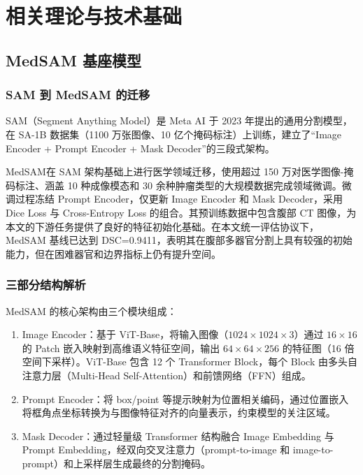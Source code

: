 \chapter{相关理论与技术基础}

\section{MedSAM 基座模型}

\subsection{SAM 到 MedSAM 的迁移}

SAM（Segment Anything Model）\cite{kirillov2023segment}是 Meta AI 于 2023 年提出的通用分割模型，在 SA-1B 数据集（1100 万张图像、10 亿个掩码标注）上训练，建立了“Image Encoder + Prompt Encoder + Mask Decoder”的三段式架构。

MedSAM\cite{ma2024medsam}在 SAM 架构基础上进行医学领域迁移，使用超过 150 万对医学图像-掩码标注、涵盖 10 种成像模态和 30 余种肿瘤类型的大规模数据完成领域微调。微调过程冻结 Prompt Encoder，仅更新 Image Encoder 和 Mask Decoder，采用 Dice Loss 与 Cross-Entropy Loss 的组合。其预训练数据中包含腹部 CT 图像，为本文的下游任务提供了良好的特征初始化基础。在本文统一评估协议下，MedSAM 基线已达到 DSC=0.9411，表明其在腹部多器官分割上具有较强的初始能力，但在困难器官和边界指标上仍有提升空间。

\subsection{三部分结构解析}

MedSAM 的核心架构由三个模块组成\cite{kirillov2023segment, ma2024medsam}：

\begin{enumerate}
  \item Image Encoder：基于 ViT-Base\cite{dosovitskiy2021vit}，将输入图像（$1024 \times 1024 \times 3$）通过 $16 \times 16$ 的 Patch 嵌入映射到高维语义特征空间，输出 $64 \times 64 \times 256$ 的特征图（16 倍空间下采样）。ViT-Base 包含 12 个 Transformer Block，每个 Block 由多头自注意力层（Multi-Head Self-Attention）和前馈网络（FFN）组成。
  \item Prompt Encoder：将 box/point 等提示映射为位置相关编码，通过位置嵌入将框角点坐标转换为与图像特征对齐的向量表示，约束模型的关注区域。
  \item Mask Decoder：通过轻量级 Transformer 结构融合 Image Embedding 与 Prompt Embedding，经双向交叉注意力（prompt-to-image 和 image-to-prompt）和上采样层生成最终的分割掩码。
\end{enumerate}

